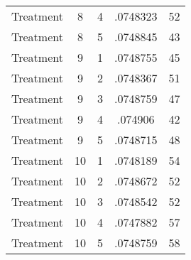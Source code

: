\begin{tabular}{l*{4}{c}}
Treatment           &           8&           4&    .0748323&          52\\
Treatment           &           8&           5&    .0748845&          43\\
Treatment           &           9&           1&    .0748755&          45\\
Treatment           &           9&           2&    .0748367&          51\\
Treatment           &           9&           3&    .0748759&          47\\
Treatment           &           9&           4&     .074906&          42\\
Treatment           &           9&           5&    .0748715&          48\\
Treatment           &          10&           1&    .0748189&          54\\
Treatment           &          10&           2&    .0748672&          52\\
Treatment           &          10&           3&    .0748542&          52\\
Treatment           &          10&           4&    .0747882&          57\\
Treatment           &          10&           5&    .0748759&          58\\
\hline\hline
\end{tabular}
